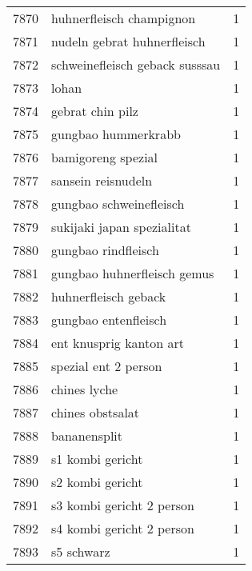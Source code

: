 \begin{tabular}{llr}
7870 &                           huhnerfleisch champignon &      1 \\
7871 &                        nudeln gebrat huhnerfleisch &      1 \\
7872 &                     schweinefleisch geback susssau &      1 \\
7873 &                                              lohan &      1 \\
7874 &                                   gebrat chin pilz &      1 \\
7875 &                                gungbao hummerkrabb &      1 \\
7876 &                                 bamigoreng spezial &      1 \\
7877 &                                 sansein reisnudeln &      1 \\
7878 &                            gungbao schweinefleisch &      1 \\
7879 &                         sukijaki japan spezialitat &      1 \\
7880 &                                gungbao rindfleisch &      1 \\
7881 &                        gungbao huhnerfleisch gemus &      1 \\
7882 &                               huhnerfleisch geback &      1 \\
7883 &                               gungbao entenfleisch &      1 \\
7884 &                            ent knusprig kanton art &      1 \\
7885 &                               spezial ent 2 person &      1 \\
7886 &                                       chines lyche &      1 \\
7887 &                                   chines obstsalat &      1 \\
7888 &                                       bananensplit &      1 \\
7889 &                                   s1 kombi gericht &      1 \\
7890 &                                   s2 kombi gericht &      1 \\
7891 &                          s3 kombi gericht 2 person &      1 \\
7892 &                          s4 kombi gericht 2 person &      1 \\
7893 &                                         s5 schwarz &      1 \\

\end{tabular}
